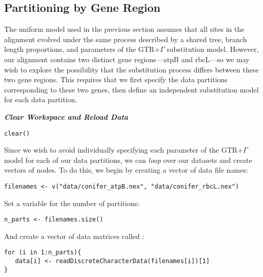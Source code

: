 \subsection{Partitioning by Gene Region}\label{secByGene}

The uniform model used in the previous section assumes that all sites in the alignment evolved under the same process described by a shared tree, branch length proportions, and parameters of the GTR+$\Gamma$ substitution model.
However, our alignment contains two distinct gene regions---atpB and rbcL---so we may wish to explore the possibility that the substitution process differs between these two gene regions.
This requires that we first specify the data partitions corresponding to these two genes, then define an independent substitution model for each data partition. 

\textbf{\textit{Clear Workspace and Reload Data}}

{\tt \begin{snugshade*}
\begin{lstlisting}
clear()
\end{lstlisting}
\end{snugshade*}}

Since we wish to avoid individually specifying each parameter of the GTR+$\Gamma$ model for each of our data partitions, we can \textit{loop} over our datasets and create vectors of nodes.
To do this, we begin by creating a vector of data file names:
{\tt \begin{snugshade*}
\begin{lstlisting}
filenames <- v("data/conifer_atpB.nex", "data/conifer_rbcL.nex")
\end{lstlisting}
\end{snugshade*}}

Set a variable for the number of partitions:
{\tt \begin{snugshade*}
\begin{lstlisting}
n_parts <- filenames.size()
\end{lstlisting}
\end{snugshade*}}

And create a vector of data matrices called :
{\tt \begin{snugshade*}
\begin{lstlisting}
for (i in 1:n_parts){
   data[i] <- readDiscreteCharacterData(filenames[i])[1]
}
\end{lstlisting}
\end{snugshade*}}

